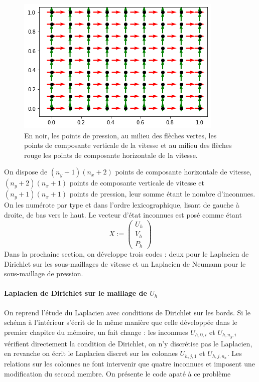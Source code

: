 \begin{figure}[htp]
    \centering
    \includegraphics{Images/preliminaires/maillages/MAC 2D.png}
    \caption{En noir, les points de pression, au milieu des flèches vertes, les points de composante verticale de la vitesse et au milieu des flèches rouge les points de composante horizontale de la vitesse.}
\end{figure}

On dispose de $(n_y+1)(n_x+2)$ points de composante horizontale de vitesse, $(n_y+2)(n_x+1)$ points de composante verticale de vitesse et $(n_y+1)(n_x+1)$ points de pression, leur somme étant le nombre d'inconnues. On les numérote par type et dans l'ordre lexicographique, lisant de gauche à droite, de bas vers le haut. Le vecteur d'état inconnues est posé comme étant $$ X := \begin{pmatrix} U_h \\ V_h \\ P_h \end{pmatrix} $$ Dans la prochaine section, on développe trois codes : deux pour le Laplacien de Dirichlet sur les sous-maillages de vitesse et un Laplacien de Neumann pour le sous-maillage de pression.

\paragraph{Laplacien de Dirichlet sur le maillage de $U_h$} On reprend l'étude du Laplacien avec conditions de Dirichlet sur les bords. Si le schéma à l'intérieur s'écrit de la même manière que celle développée dans le premier chapitre du mémoire, un fait change : les inconnues $U_{h,0,i}$ et $U_{h,n_y,i}$ vérifient directement la condition de Dirichlet, on n'y discrétise pas le Laplacien, en revanche on écrit le Laplacien discret sur les colonnes $U_{h,j,1}$ et $U_{h,j,n_x}$. Les relations sur les colonnes ne font intervenir que quatre inconnues et imposent une modification du second membre. On présente le code apaté à ce problème

